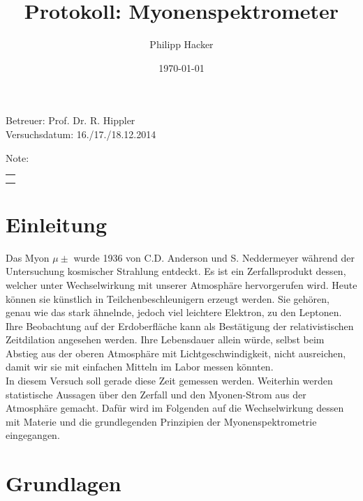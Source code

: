 \documentclass[numbers=noenddot,12pt,a4paper]{scrartcl}
\title{Protokoll: Myonenspektrometer} %
\author{Philipp Hacker} %
\date{\today}
\begin{document}
\maketitle
\begin{center}
Betreuer: Prof. Dr. R. Hippler \\ %
Versuchsdatum: 16./17./18.12.2014\\ %
\begin{table}[h]
\centering
Note: %
\begin{tabularx}{1.5cm}{|X|}
\hline \\ \\
\hline
\end{tabularx}
\end{table}
\end{center}
\vspace*{\fill}
\tableofcontents
\vfill
\newpage
\section{Einleitung}
Das Myon $\mu\pm$ wurde 1936 von C.D. Anderson und S. Neddermeyer während der Untersuchung kosmischer Strahlung entdeckt. Es ist ein Zerfallsprodukt dessen, welcher unter Wechselwirkung mit unserer Atmosphäre hervorgerufen wird. Heute können sie künstlich in Teilchenbeschleunigern erzeugt werden. Sie gehören, genau wie das stark ähnelnde, jedoch viel leichtere Elektron, zu den Leptonen. Ihre Beobachtung auf der Erdoberfläche kann als Bestätigung der relativistischen Zeitdilation angesehen werden. Ihre Lebensdauer allein würde, selbst beim Abstieg aus der oberen Atmosphäre mit Lichtgeschwindigkeit, nicht ausreichen, damit wir sie mit einfachen Mitteln im Labor messen könnten.\\
In diesem Versuch soll gerade diese Zeit gemessen werden. Weiterhin werden statistische Aussagen über den Zerfall und den Myonen-Strom aus der Atmosphäre gemacht. Dafür wird im Folgenden auf die Wechselwirkung dessen mit Materie und die grundlegenden Prinzipien der Myonenspektrometrie eingegangen.
\newpage
\section{Grundlagen}
\end{document}
